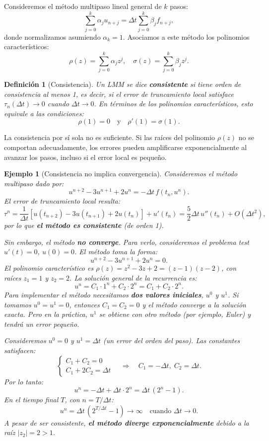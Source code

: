 \documentclass[a4paper,11pt]{report}
\newtheorem{definition}[theorem]{Definición}
\newtheorem{example}[theorem]{Ejemplo}
\begin{document}
Consideremos el método multipaso lineal general de $k$ pasos:
\[ \sum_{j=0}^k \alpha_j u_{n+j} = \Delta t\sum_{j=0}^k \beta_j f_{n+j}, \]
donde normalizamos asumiendo $\alpha_k = 1$. Asociamos a este método los polinomios característicos:
\[ \rho(z) = \sum_{j=0}^k \alpha_j z^j, \quad \sigma(z) = \sum_{j=0}^k \beta_j z^j. \]

\begin{definition}[Consistencia]
Un LMM se dice \textbf{consistente} si tiene orden de consistencia al menos 1, es decir, si el error de truncamiento local satisface $\tau_n(\Delta t) \to 0$ cuando $\Delta t \to 0$. En términos de los polinomios característicos, esto equivale a las condiciones:
\[ \rho(1) = 0 \quad \text{y} \quad \rho'(1) = \sigma(1). \]
\end{definition}

La consistencia por sí sola no es suficiente. Si las raíces del polinomio $\rho(z)$ no se comportan adecuadamente, los errores pueden amplificarse exponencialmente al avanzar los pasos, incluso si el error local es pequeño.

\begin{example}[Consistencia no implica convergencia]
Consideremos el método multipaso dado por:
\[
u^{n+2} - 3u^{n+1} + 2u^{n} = -\Delta t\,f(t_n, u^n).
\]
El error de truncamiento local resulta:
\[
\tau^n = \frac{1}{\Delta t} [u(t_{n+2}) - 3u(t_{n+1}) + 2u(t_{n})] + u'(t_n) = \frac{5}{2}\Delta t\,u''(t_n) + O(\Delta t^2),
\]
por lo que \textbf{el método es consistente} (de orden 1).

Sin embargo, el método \textbf{no converge}. Para verlo, consideremos el problema test $u'(t) = 0$, $u(0) = 0$. El método toma la forma:
\[
u^{n+2} - 3u^{n+1} + 2u^{n} = 0.
\]
El polinomio característico es $\rho(z) = z^2 - 3z + 2 = (z-1)(z-2)$, con raíces $z_1 = 1$ y $z_2 = 2$. La solución general de la recurrencia es:
\[
u^n = C_1 \cdot 1^n + C_2 \cdot 2^n = C_1 + C_2 \cdot 2^n.
\]
Para implementar el método necesitamos \textbf{dos valores iniciales}, $u^0$ y $u^1$. Si tomamos $u^0 = u^1 = 0$, entonces $C_1 = C_2 = 0$ y el método converge a la solución exacta. Pero en la práctica, $u^1$ se obtiene con otro método (por ejemplo, Euler) y tendrá un error pequeño.

Consideremos $u^0 = 0$ y $u^1 = \Delta t$ (un error del orden del paso). Las constantes satisfacen:
\[
\begin{cases}
C_1 + C_2 = 0 \\
C_1 + 2C_2 = \Delta t
\end{cases}
\quad \Rightarrow \quad C_1 = -\Delta t, \; C_2 = \Delta t.
\]
Por lo tanto:
\[
u^n = -\Delta t + \Delta t \cdot 2^n = \Delta t\,(2^n - 1).
\]
En el tiempo final $T$, con $n = T/\Delta t$:
\[
u^n = \Delta t\,(2^{T/\Delta t} - 1) \to \infty \quad \text{cuando } \Delta t \to 0.
\]
A pesar de ser consistente, \textbf{el método diverge exponencialmente} debido a la raíz $|z_2| = 2 > 1$.
\end{example}
\end{document}
